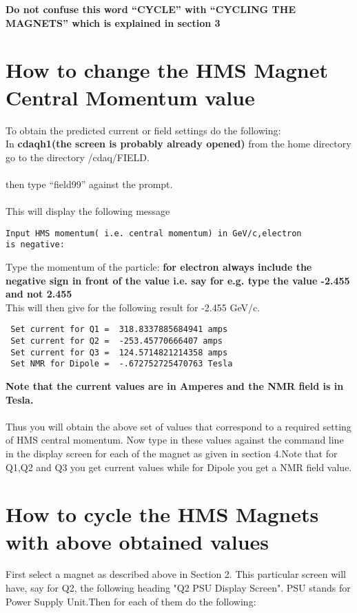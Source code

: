 \documentclass[12pt,epsf,here]{article}
\begin{document}
\textbf{Do not confuse this word ``CYCLE'' with ``CYCLING THE MAGNETS'' 
which is explained in section 3}
\\
\section{How to change the HMS Magnet Central Momentum value}

To obtain the predicted current or field settings do the following:
\\
In \textbf{cdaqh1(the screen is probably already opened) } from the home
directory go to the directory /cdaq/FIELD.\\
\\
then type ``field99'' against the prompt.\\
\\
This will display the following message\\
\begin{verbatim}Input HMS momentum( i.e. central momentum) in GeV/c,electron 
is negative: \end{verbatim}  

Type the momentum of the particle: \textbf{for electron always include the 
negative sign in front of the value i.e. say for e.g. type the value
-2.455 and not 2.455}
\\
This will then give for the following result for -2.455 GeV/c.\\
\begin{verbatim}
 Set current for Q1 =  318.8337885684941 amps
 Set current for Q2 =  -253.45770666407 amps
 Set current for Q3 =  124.5714821214358 amps
 Set NMR for Dipole =  -.672752725470763 Tesla
\end{verbatim}
\textbf{Note that the current values are in Amperes and the NMR field is in
Tesla.}\\
\\
Thus you will obtain the above set of values that correspond to  a
required setting of HMS central momentum. Now type in these values against
the command line in the display screen for each of the magnet as
given in section 4.Note that for Q1,Q2 and Q3 you get current values while
for Dipole you get a NMR field value. 

\section{How to cycle the HMS Magnets with above obtained values }

First select a magnet as described above in Section 2. This particular 
screen will have, say for Q2, the following heading "Q2 PSU Display
Screen". PSU stands for Power Supply Unit.Then for each of them do the
following:
\end{document}
